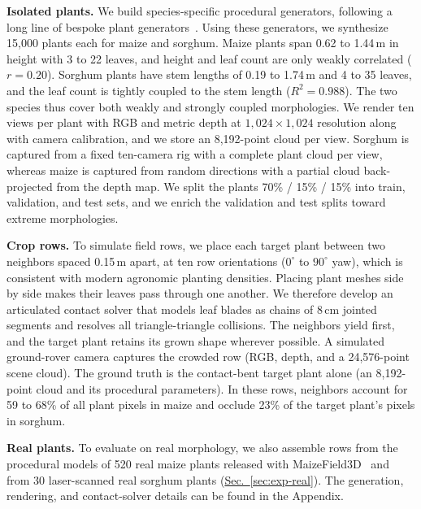 \documentclass[10pt,twocolumn,letterpaper]{article}
\newcommand{\secref}[1]{\hyperref[#1]{Sec.~\ref*{#1}}}
\newcommand{\appendixref}[1]{\hyperref[#1]{Appendix~\ref*{#1}}}
\begin{document}
\noindent\textbf{Isolated plants.}
We build species-specific procedural generators, following a long line of bespoke plant generators~\citep{prusin1990abop,fournier1998maize,boudon2012lpy,cieslak2024agdata,floraforge2026,hadadi2025procmaize,vazquez_phenoframe_2026,ostermann_sorghum_2024}. Using these generators, we synthesize 15{,}000 plants each for maize and sorghum. Maize plants span 0.62 to 1.44\,m in height with 3 to 22 leaves, and height and leaf count are only weakly correlated ($r = 0.20$). Sorghum plants have stem lengths of 0.19 to 1.74\,m and 4 to 35 leaves, and the leaf count is tightly coupled to the stem length ($R^2 = 0.988$). The two species thus cover both weakly and strongly coupled morphologies. We render ten views per plant with RGB and metric depth at $1{,}024 \times 1{,}024$ resolution along with camera calibration, and we store an 8{,}192-point cloud per view. Sorghum is captured from a fixed ten-camera rig with a complete plant cloud per view, whereas maize is captured from random directions with a partial cloud back-projected from the depth map. We split the plants 70\% / 15\% / 15\% into train, validation, and test sets, and we enrich the validation and test splits toward extreme morphologies.

\noindent\textbf{Crop rows.}
To simulate field rows, we place each target plant between two neighbors spaced 0.15\,m apart, at ten row orientations ($0^\circ$ to $90^\circ$ yaw),  which is consistent with modern agronomic planting densities. Placing plant meshes side by side makes their leaves pass through one another. We therefore develop an articulated contact solver that models leaf blades as chains of 8\,cm jointed segments and resolves all triangle-triangle collisions. The neighbors yield first, and the target plant retains its grown shape wherever possible. A simulated ground-rover camera captures the crowded row (RGB, depth, and a 24{,}576-point scene cloud). The ground truth is the contact-bent target plant alone (an 8{,}192-point cloud and its procedural parameters). In these rows, neighbors account for 59 to 68\% of all plant pixels in maize and occlude 23\% of the target plant's pixels in sorghum.

\noindent\textbf{Real plants.}
To evaluate on real morphology, we also assemble rows from the procedural models of 520 real maize plants released with MaizeField3D~\citep{maizefield3d2025} and from 30 laser-scanned real sorghum plants (\secref{sec:exp-real}). The generation, rendering, and contact-solver details can be found in the Appendix.
\end{document}
